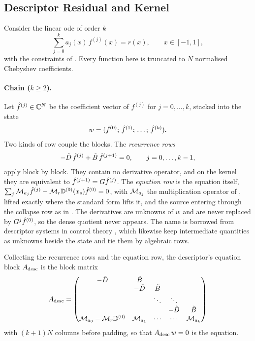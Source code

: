 \subsection{Descriptor Residual and Kernel}
\label{sec:descriptor-layouts}

Consider the linear \gls{ode} of order $k$
\begin{equation}
  \sum_{j=0}^{k} a_j(x)\, f^{(j)}(x) = r(x), \qquad x \in [-1,1],
\end{equation}
with the constraints of . Every function here is truncated to $N$ normalised Chebyshev coefficients.

\paragraph{Chain ($k\ge2$).} Let $\hat{f}^{(j)}\in\mathbb{C}^N$ be the coefficient vector of $f^{(j)}$ for $j=0,\dots,k$, stacked into the state
\begin{equation}
  w = (\hat{f}^{(0)};\, \hat{f}^{(1)};\, \dots;\, \hat{f}^{(k)}).
\end{equation}
Two kinds of row couple the blocks. The \emph{recurrence rows}
\begin{equation}
  -\tilde{D}\, \hat{f}^{(j)} + \tilde{B}\, \hat{f}^{(j+1)} = 0, \qquad j = 0, \dots, k-1,
  \label{eq:descriptor-recurrence-rows}
\end{equation}
apply  block by block. They contain no derivative operator, and on the kernel they are equivalent to $\hat{f}^{(j+1)}=G\hat{f}^{(j)}$. The \emph{equation row} is the equation itself, $\sum_j\mathcal{M}_{a_j}\hat{f}^{(j)}-\mathcal{M}_r\mathbb{D}^{(0)}(x_s)\hat{f}^{(0)}=0$, with $\mathcal{M}_{a_j}$ the multiplication operator of , lifted exactly where the standard form lifts it, and the source entering through the collapse row as in . The derivatives are unknowns of $w$ and are never replaced by $G^j\hat{f}^{(0)}$, so the dense quotient  never appears. The name is borrowed from descriptor systems in control theory \cite{luenberger1977descriptor,dai1989singular}, which likewise keep intermediate quantities as unknowns beside the state and tie them by algebraic rows.

\begin{definition}
\label{def:descriptor-residual-operator}
Collecting the recurrence rows and the equation row, the descriptor's equation block $A_{\mathrm{desc}}$ is the block matrix
\begin{equation}
A_{\mathrm{desc}} =
\begin{pmatrix}
-\tilde{D} & \tilde{B} &        &        &          \\
          & -\tilde{D} & \tilde{B} &      &          \\
          &          & \ddots & \ddots &          \\
          &          &        & -\tilde{D} & \tilde{B} \\
\mathcal{M}_{a_0} - \mathcal{M}_r\mathbb{D}^{(0)} & \mathcal{M}_{a_1}  & \cdots & \cdots & \mathcal{M}_{a_k}
\end{pmatrix}
\end{equation}
with $(k+1)N$ columns before padding, so that $A_{\mathrm{desc}}\,w=0$ is the equation.
\end{definition}

